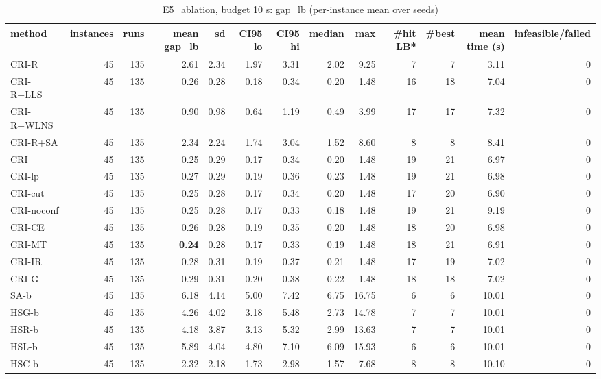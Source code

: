 \begin{table}[htbp]
\centering
\small
\caption{E5\_ablation, budget 10 s: gap\_lb (per-instance mean over seeds)}
\label{tab:E5_ablation_b10_summary}
\begin{tabular}{lrrrrrrrrrrrr}
\toprule
method & instances & runs & mean gap\_lb & sd & CI95 lo & CI95 hi & median & max & \#hit LB* & \#best & mean time (s) & infeasible/failed \\
\midrule
CRI-R & 45 & 135 & 2.61 & 2.34 & 1.97 & 3.31 & 2.02 & 9.25 & 7 & 7 & 3.11 & 0 \\
CRI-R+LLS & 45 & 135 & 0.26 & 0.28 & 0.18 & 0.34 & 0.20 & 1.48 & 16 & 18 & 7.04 & 0 \\
CRI-R+WLNS & 45 & 135 & 0.90 & 0.98 & 0.64 & 1.19 & 0.49 & 3.99 & 17 & 17 & 7.32 & 0 \\
CRI-R+SA & 45 & 135 & 2.34 & 2.24 & 1.74 & 3.04 & 1.52 & 8.60 & 8 & 8 & 8.41 & 0 \\
CRI & 45 & 135 & 0.25 & 0.29 & 0.17 & 0.34 & 0.20 & 1.48 & 19 & 21 & 6.97 & 0 \\
CRI-lp & 45 & 135 & 0.27 & 0.29 & 0.19 & 0.36 & 0.23 & 1.48 & 19 & 21 & 6.98 & 0 \\
CRI-cut & 45 & 135 & 0.25 & 0.28 & 0.17 & 0.34 & 0.20 & 1.48 & 17 & 20 & 6.90 & 0 \\
CRI-noconf & 45 & 135 & 0.25 & 0.28 & 0.17 & 0.33 & 0.18 & 1.48 & 19 & 21 & 9.19 & 0 \\
CRI-CE & 45 & 135 & 0.26 & 0.28 & 0.19 & 0.35 & 0.20 & 1.48 & 18 & 20 & 6.98 & 0 \\
CRI-MT & 45 & 135 & \textbf{0.24} & 0.28 & 0.17 & 0.33 & 0.19 & 1.48 & 18 & 21 & 6.91 & 0 \\
CRI-IR & 45 & 135 & 0.28 & 0.31 & 0.19 & 0.37 & 0.21 & 1.48 & 17 & 19 & 7.02 & 0 \\
CRI-G & 45 & 135 & 0.29 & 0.31 & 0.20 & 0.38 & 0.22 & 1.48 & 18 & 18 & 7.02 & 0 \\
SA-b & 45 & 135 & 6.18 & 4.14 & 5.00 & 7.42 & 6.75 & 16.75 & 6 & 6 & 10.01 & 0 \\
HSG-b & 45 & 135 & 4.26 & 4.02 & 3.18 & 5.48 & 2.73 & 14.78 & 7 & 7 & 10.01 & 0 \\
HSR-b & 45 & 135 & 4.18 & 3.87 & 3.13 & 5.32 & 2.99 & 13.63 & 7 & 7 & 10.01 & 0 \\
HSL-b & 45 & 135 & 5.89 & 4.04 & 4.80 & 7.10 & 6.09 & 15.93 & 6 & 6 & 10.01 & 0 \\
HSC-b & 45 & 135 & 2.32 & 2.18 & 1.73 & 2.98 & 1.57 & 7.68 & 8 & 8 & 10.10 & 0 \\
\bottomrule
\end{tabular}
\end{table}

